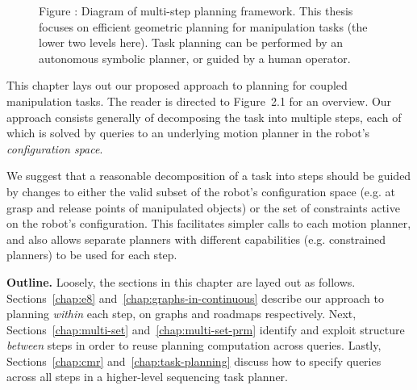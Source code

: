 \begin{figure}
\begin{center}


   \end{center}
   
   \smallskip\noindent\small Figure \thefigure:
      Diagram of multi-step planning framework.
      This thesis focuses on efficient geometric planning
      for manipulation tasks (the lower two levels here).
      Task planning can be performed by an autonomous
      symbolic planner,
      or guided by a human operator.
   
   \label{fig:xx-diagram-multi-step}
   
\end{figure}

This chapter lays out our proposed approach
to planning for coupled manipulation tasks.
The reader is directed to
Figure~2.1
for an overview.
Our approach consists generally of decomposing the task into
multiple steps,
each of which is solved by queries to an underlying motion
planner in the robot's
\emph{configuration space}\cite{lozanoperez1983cspace}.


We suggest that a reasonable decomposition of a task into steps
should be guided by changes to either
the valid subset of the robot's configuration space
(e.g. at grasp and release points of manipulated objects)
or the set of constraints active on the robot's configuration.
This facilitates simpler calls to each motion planner,
and also allows separate planners with different capabilities
(e.g. constrained planners)
to be used for each step.

\textbf{Outline.}
Loosely, the sections in this chapter are layed out as follows.
Sections~\ref{chap:e8} and~\ref{chap:graphs-in-continuous}
describe our approach to planning \emph{within} each step,
on graphs and roadmaps respectively.
Next,
Sections~\ref{chap:multi-set} and~\ref{chap:multi-set-prm}
identify and exploit structure \emph{between} steps
in order to reuse planning computation across queries.
Lastly,
Sections~\ref{chap:cmr} and~\ref{chap:task-planning}
discuss how to specify queries across all steps
in a higher-level sequencing task planner.


